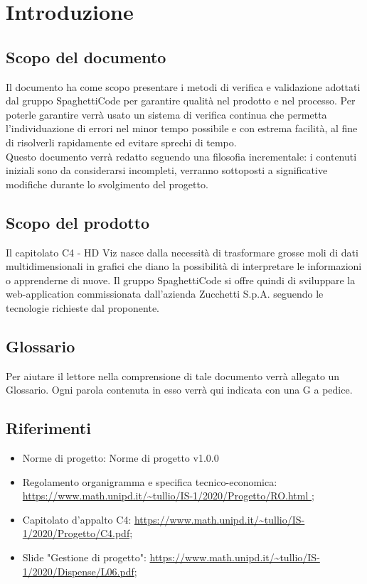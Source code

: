 \documentclass{article}
\begin{document}


\section{Introduzione}%
\label{sec:introduzione}

\subsection{Scopo del documento}%
\label{sub:scopo_del_documento}
Il documento ha come scopo presentare i metodi di verifica e validazione adottati dal gruppo SpaghettiCode per garantire qualità nel prodotto e nel processo. Per poterle garantire verrà usato un sistema di verifica continua che permetta l'individuazione di errori nel minor tempo possibile e con estrema facilità, al fine di risolverli rapidamente ed evitare sprechi di tempo.\\
Questo documento verrà redatto seguendo una filosofia incrementale: i contenuti iniziali sono da considerarsi incompleti, verranno sottoposti a significative modifiche durante lo svolgimento del progetto. 

\subsection{Scopo del prodotto}%
\label{sub:scopo_prodotto}
Il capitolato C4 - HD Viz nasce dalla necessità di trasformare grosse moli di dati multidimensionali in grafici che diano la possibilità di interpretare le informazioni o apprenderne di nuove. Il gruppo SpaghettiCode si offre quindi di sviluppare la web-application commissionata dall’azienda Zucchetti S.p.A. seguendo le tecnologie richieste dal proponente. 


\subsection{Glossario}%
\label{sub:glossario}
Per aiutare il lettore nella comprensione di tale documento verrà allegato un Glossario. Ogni parola contenuta in esso verrà qui indicata con una G a pedice.


\subsection{Riferimenti}%
\label{sub:riferimenti}
\begin{itemize}
\item Norme di progetto: Norme di progetto v1.0.0
\item Regolamento organigramma e specifica tecnico-economica: \url{https://www.math.unipd.it/~tullio/IS-1/2020/Progetto/RO.html };
\item Capitolato d’appalto C4: \url{https://www.math.unipd.it/~tullio/IS-1/2020/Progetto/C4.pdf};
\item Slide "Gestione di progetto": \url{https://www.math.unipd.it/~tullio/IS-1/2020/Dispense/L06.pdf};
\end{itemize}
\end{document}
